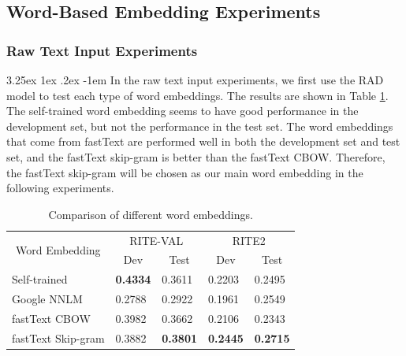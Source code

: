 \documentclass[12pt]{article}
\makeatletter
\renewcommand\paragraph{\@startsection{paragraph}{5}{\z@}%
  {3.25ex \@plus1ex \@minus.2ex}%
  {-1em}%
  {\normalfont\normalsize\bfseries}}
\makeatother
\begin{document}
\begin{CJK*}{UTF8}{bkai}
\begin{spacing}{1.77}
\subsection{Word-Based Embedding Experiments}
\subsubsection{Raw Text Input Experiments}
\paragraph{}
In the raw text input experiments, we first use the RAD model to test each type of word embeddings. The results are shown in Table \ref{result:nnlm_comparison}. The self-trained word embedding seems to have good performance in the development set, but not the performance in the test set. The word embeddings that come from fastText are performed well in both the development set and test set, and the fastText skip-gram is better than the fastText CBOW. Therefore, the fastText skip-gram will be chosen as our main word embedding in the following experiments.

\begin{table}[H]
  \centering
  \setlength{\extrarowheight}{-3pt}
  \begin{tabular}{|l|l|l|l|l|}
  \hline
  \multicolumn{1}{|c|}{\multirow{2}{*}{Word   Embedding}} & \multicolumn{2}{c|}{RITE-VAL} & \multicolumn{2}{c|}{RITE2} \\ \cline{2-5}
  \multicolumn{1}{|c|}{} & \multicolumn{1}{c|}{Dev} & \multicolumn{1}{c|}{Test} & \multicolumn{1}{c|}{Dev} & \multicolumn{1}{c|}{Test} \\ \hline
  Self-trained & \textbf{0.4334} & 0.3611 & 0.2203 & 0.2495 \\ \hline
  Google NNLM & 0.2788 & 0.2922 & 0.1961 & 0.2549 \\ \hline
  fastText CBOW & 0.3982 & 0.3662 & 0.2106 & 0.2343 \\ \hline
  fastText Skip-gram & 0.3882 & \textbf{0.3801} & \textbf{0.2445} & \textbf{0.2715} \\ \hline
  \end{tabular}
  \caption{Comparison of different word embeddings.}
  \label{result:nnlm_comparison}
\end{table}


\end{spacing}
\end{CJK*}
\end{document}
